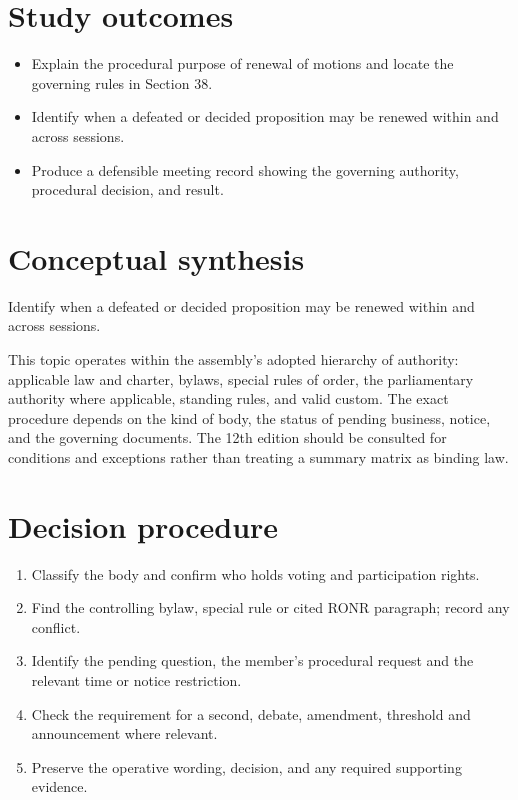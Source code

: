 \documentclass[11pt]{article}
\begin{document}
\SuiteOpen
{}
\section{Study outcomes}
\begin{itemize}[leftmargin=*,itemsep=4pt]
\item Explain the procedural purpose of renewal of motions and locate the governing rules in Section 38.
\item Identify when a defeated or decided proposition may be renewed within and across sessions.
\item Produce a defensible meeting record showing the governing authority, procedural decision, and result.
\end{itemize}

\section{Conceptual synthesis}
Identify when a defeated or decided proposition may be renewed within and across sessions.

This topic operates within the assembly’s adopted hierarchy of authority: applicable law and charter, bylaws, special rules of order, the parliamentary authority where applicable, standing rules, and valid custom. The exact procedure depends on the kind of body, the status of pending business, notice, and the governing documents. The 12th edition should be consulted for conditions and exceptions rather than treating a summary matrix as binding law.
\section{Decision procedure}
\begin{enumerate}[leftmargin=*,itemsep=4pt]
\item Classify the body and confirm who holds voting and participation rights.
\item Find the controlling bylaw, special rule or cited RONR paragraph; record any conflict.
\item Identify the pending question, the member’s procedural request and the relevant time or notice restriction.
\item Check the requirement for a second, debate, amendment, threshold and announcement where relevant.
\item Preserve the operative wording, decision, and any required supporting evidence.
\end{enumerate}
\end{document}
